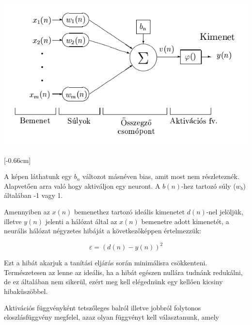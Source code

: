 \begin{center}
	\includegraphics[scale=0.6]{images/ANNParts.png}
\end{center}

[-0.66cm]

A képen láthatunk egy \(b_n\) változot másnéven bias, amit most nem részleteznék. Alapvetően arra való hogy aktiváljon egy neuront. A \(b(n)\)-hez tartozó súly (\(w_b\)) általában -1 vagy 1.

Amennyiben az \(x(n)\) bemenethez tartozó ideális kimenetet \(d(n)\)-nel jelöljük, illetve \(y(n)\) jelenti a hálózat által az \(x(n)\) bemenetre adott kimenetét, a neurális hálózat négyzetes hibáját a következőképpen értelmezzük:

\[ \varepsilon = (d(n) - y(n))^2\]

Ezt a hibát akarjuk a tanítási eljárás során minimálisra csökkenteni. Természetesen az lenne az ideális, ha a hibát egészen nullára tudnánk redukálni, de ez általában nem sikerül, ezért meg kell elégednünk egy kellően kicsiny hibaküszöbbel.

Aktivációs függvényként tetszőleges balról illetve jobbról folytonos eloszlásfüggvény megfelel, azaz olyan függvényt kell választanunk, amely

